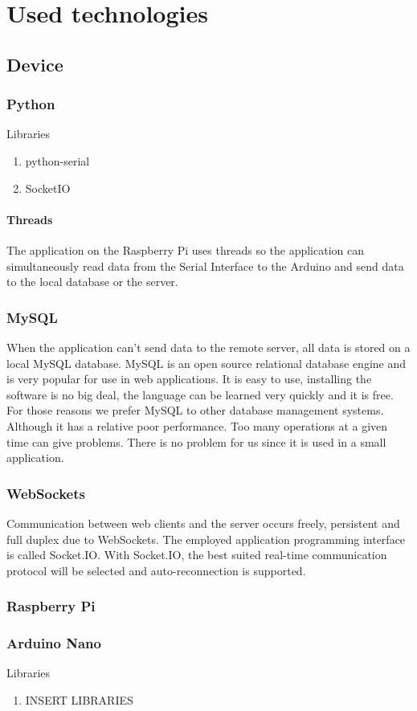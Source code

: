 \section{Used technologies}
\subsection{Device}
\subsubsection{Python}
Libraries
\begin{enumerate}
 \item python-serial
 \item SocketIO
\end{enumerate}
\paragraph{Threads}
The application on the Raspberry Pi uses threads so the application can simultaneously read data from the Serial Interface to the Arduino and send data to the local database or the server.
\subsubsection{MySQL}
When the application can't send data to the remote server, all data is stored on a local MySQL database. MySQL is an open source relational database engine and is very popular for use in web applications. It is easy to use, installing the software is no big deal, the language can be learned very quickly and it is free. For those reasons we prefer MySQL to other database management systems. Although it has a relative poor performance. Too many operations at a given time can give problems. There is no problem for us since it is used in a small application.
\subsubsection{WebSockets}
Communication between web clients and the server occurs freely, persistent and full duplex due to WebSockets. The employed application programming interface is called Socket.IO. With Socket.IO, the best suited real-time communication protocol will be selected and auto-reconnection is supported.
\subsubsection{Raspberry Pi}
\subsubsection{Arduino Nano}
Libraries
\begin{enumerate}
 \item INSERT LIBRARIES
\end{enumerate}


